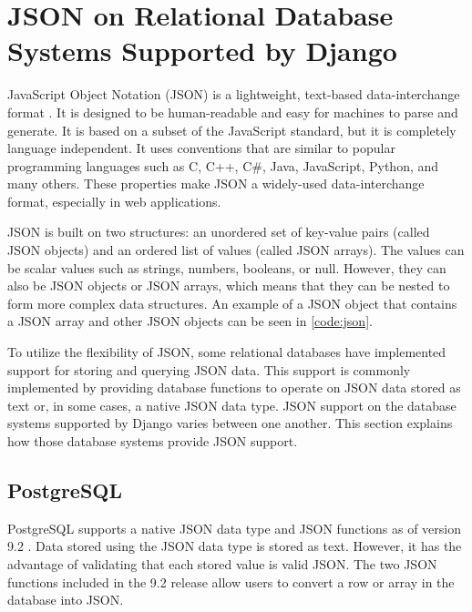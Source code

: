 \section{JSON on Relational Database Systems Supported by Django}

JavaScript Object Notation (JSON) is a lightweight, text-based data-interchange
format \cite{json}. It is designed to be human-readable and easy for machines
to parse and generate. It is based on a subset of the JavaScript standard, but
it is completely language independent. It uses conventions that are similar to
popular programming languages such as C, C++, C\#, Java, JavaScript, Python,
and many others. These properties make JSON a widely-used data-interchange
format, especially in web applications.

JSON is built on two structures: an unordered set of key-value pairs (called
JSON objects) and an ordered list of values (called JSON arrays). The values
can be scalar values such as strings, numbers, booleans, or null. However, they
can also be JSON objects or JSON arrays, which means that they can be nested
to form more complex data structures. An example of a JSON object that contains
a JSON array and other JSON objects can be seen in \autoref{code:json}.



To utilize the flexibility of JSON, some relational databases have implemented
support for storing and querying JSON data. This support is commonly
implemented by providing database functions to operate on JSON data stored as
text or, in some cases, a native JSON data type. JSON support on the database
systems supported by Django varies between one another. This section explains
how those database systems provide JSON support.

\subsection{PostgreSQL}

PostgreSQL supports a native JSON data type and JSON functions as of version
9.2 \cite{postgresql:9.2}. Data stored using the JSON data type is stored as
text. However, it has the advantage of validating that each stored value is
valid JSON. The two JSON functions included in the 9.2 release allow users to
convert a row or array in the database into JSON.

